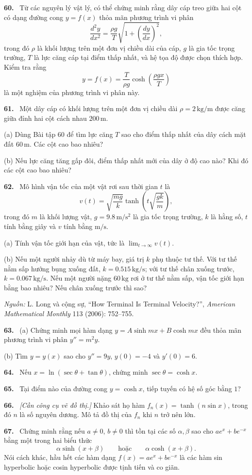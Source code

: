 \documentclass[12pt,a4paper]{article}
\newcommand{\bt}[1]{\par\smallskip\Needspace{5\baselineskip}\noindent\textbf{#1.}\ }
\begin{document}
\bt{60} Từ các nguyên lý vật lý, có thể chứng minh rằng dây cáp treo giữa hai cột có dạng đường cong $y=f(x)$ thỏa mãn phương trình vi phân
\[\frac{d^2y}{dx^2}=\frac{\rho g}{T}\sqrt{1+\left(\frac{dy}{dx}\right)^2},\]
trong đó $\rho$ là khối lượng trên một đơn vị chiều dài của cáp, $g$ là gia tốc trọng trường, $T$ là lực căng cáp tại điểm thấp nhất, và hệ tọa độ được chọn thích hợp. Kiểm tra rằng
\[y=f(x)=\frac{T}{\rho g}\cosh\left(\frac{\rho gx}{T}\right)\]
là một nghiệm của phương trình vi phân này.

\bt{61} Một dây cáp có khối lượng trên một đơn vị chiều dài $\rho=2\,\mathrm{kg/m}$ được căng giữa đỉnh hai cột cách nhau $200\,\mathrm{m}$.

(a) Dùng Bài tập 60 để tìm lực căng $T$ sao cho điểm thấp nhất của dây cách mặt đất $60\,\mathrm{m}$. Các cột cao bao nhiêu?

(b) Nếu lực căng tăng gấp đôi, điểm thấp nhất mới của dây ở độ cao nào? Khi đó các cột cao bao nhiêu?

\bt{62} Mô hình vận tốc của một vật rơi sau thời gian $t$ là
\[v(t)=\sqrt{\frac{mg}{k}}\tanh\left(t\sqrt{\frac{gk}{m}}\right),\]
trong đó $m$ là khối lượng vật, $g=9.8\,\mathrm{m/s^2}$ là gia tốc trọng trường, $k$ là hằng số, $t$ tính bằng giây và $v$ tính bằng $\mathrm{m/s}$.

(a) Tính vận tốc giới hạn của vật, tức là $\displaystyle\lim_{t\to\infty}v(t)$.

(b) Nếu một người nhảy dù từ máy bay, giá trị $k$ phụ thuộc tư thế. Với tư thế nằm sấp hướng bụng xuống đất, $k=0.515\,\mathrm{kg/s}$; với tư thế chân xuống trước, $k=0.067\,\mathrm{kg/s}$. Nếu một người nặng $60\,\mathrm{kg}$ rơi ở tư thế nằm sấp, vận tốc giới hạn bằng bao nhiêu? Nếu chân xuống trước thì sao?

\noindent\textit{Nguồn:} L. Long và cộng sự, “How Terminal Is Terminal Velocity?”, \textit{American Mathematical Monthly} 113 (2006): 752–755.

\bt{63} (a) Chứng minh mọi hàm dạng $y=A\sinh mx+B\cosh mx$ đều thỏa mãn phương trình vi phân $y''=m^2y$.

(b) Tìm $y=y(x)$ sao cho $y''=9y$, $y(0)=-4$ và $y'(0)=6$.

\bt{64} Nếu $x=\ln(\sec\theta+\tan\theta)$, chứng minh $\sec\theta=\cosh x$.
\bt{65} Tại điểm nào của đường cong $y=\cosh x$, tiếp tuyến có hệ số góc bằng $1$?
\bt{66} \textit{[Cần công cụ vẽ đồ thị.]} Khảo sát họ hàm $f_n(x)=\tanh(n\sin x)$, trong đó $n$ là số nguyên dương. Mô tả đồ thị của $f_n$ khi $n$ trở nên lớn.
\bt{67} Chứng minh rằng nếu $a\ne0$, $b\ne0$ thì tồn tại các số $\alpha,\beta$ sao cho $ae^x+be^{-x}$ bằng một trong hai biểu thức
\[\alpha\sinh(x+\beta)\qquad\text{hoặc}\qquad\alpha\cosh(x+\beta).\]
Nói cách khác, hầu hết các hàm dạng $f(x)=ae^x+be^{-x}$ là các hàm sin hyperbolic hoặc cosin hyperbolic được tịnh tiến và co giãn.
\end{document}
